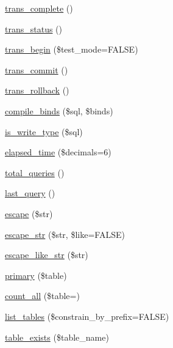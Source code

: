 \begin{DoxyCompactItemize}
\item 
\mbox{\hyperlink{class_c_i___d_b__driver_ab59892f27ae6d212d1aed5cb67f53d8c}{trans\+\_\+complete}} ()
\item 
\mbox{\hyperlink{class_c_i___d_b__driver_a90e56d041469a720a1fa34fe8c24f900}{trans\+\_\+status}} ()
\item 
\mbox{\hyperlink{class_c_i___d_b__driver_a90b3b54bb8ebd75c09e6b20c0dbd44a9}{trans\+\_\+begin}} (\$test\+\_\+mode=F\+A\+L\+SE)
\item 
\mbox{\hyperlink{class_c_i___d_b__driver_aa5c98162d0d8ece97f9013819326b95d}{trans\+\_\+commit}} ()
\item 
\mbox{\hyperlink{class_c_i___d_b__driver_a169cc233f9785219d0f281634527b65a}{trans\+\_\+rollback}} ()
\item 
\mbox{\hyperlink{class_c_i___d_b__driver_ac2aa53409ab8dba19b086243a6dd754e}{compile\+\_\+binds}} (\$sql, \$binds)
\item 
\mbox{\hyperlink{class_c_i___d_b__driver_a52dd9f1efc9f146590851f340070ba94}{is\+\_\+write\+\_\+type}} (\$sql)
\item 
\mbox{\hyperlink{class_c_i___d_b__driver_a87e9f698830db591dfd81cc45c8f6f29}{elapsed\+\_\+time}} (\$decimals=6)
\item 
\mbox{\hyperlink{class_c_i___d_b__driver_a05110905de2b2e96a9af233b00a294a0}{total\+\_\+queries}} ()
\item 
\mbox{\hyperlink{class_c_i___d_b__driver_ae213398b1e7b273897c7640966d4ebe8}{last\+\_\+query}} ()
\item 
\mbox{\hyperlink{class_c_i___d_b__driver_a75beb60cdd3ee1875646d729963f5f5f}{escape}} (\$str)
\item 
\mbox{\hyperlink{class_c_i___d_b__driver_ab095c45fc4c9eb7e67a1f53ea40499a5}{escape\+\_\+str}} (\$str, \$like=F\+A\+L\+SE)
\item 
\mbox{\hyperlink{class_c_i___d_b__driver_a9a9890fe00e29e5664ce2df0eb00b060}{escape\+\_\+like\+\_\+str}} (\$str)
\item 
\mbox{\hyperlink{class_c_i___d_b__driver_aa7f9521b7da36b0801cba09e82786c7b}{primary}} (\$table)
\item 
\mbox{\hyperlink{class_c_i___d_b__driver_af2d699120ac561ba96d22224229114d1}{count\+\_\+all}} (\$table=\textquotesingle{}\textquotesingle{})
\item 
\mbox{\hyperlink{class_c_i___d_b__driver_a8fc74649a5014331e5222913ba65a89e}{list\+\_\+tables}} (\$constrain\+\_\+by\+\_\+prefix=F\+A\+L\+SE)
\item 
\mbox{\hyperlink{class_c_i___d_b__driver_a7d4503e6186f2df6c374e16cc786e50a}{table\+\_\+exists}} (\$table\+\_\+name)

\end{DoxyCompactItemize}
